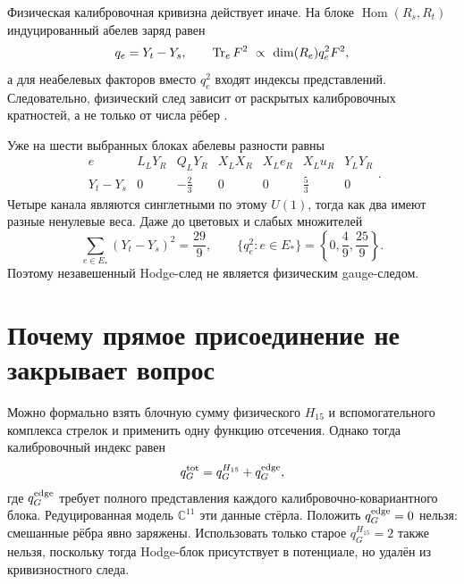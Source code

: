 Физическая калибровочная кривизна действует иначе. На блоке
$\operatorname{Hom}(R_s,R_t)$ индуцированный абелев заряд равен
\begin{equation}
 q_e=Y_t-Y_s,
 \qquad
 \operatorname{Tr}_e F^2\ \mathrel{\propto}\
 \dim(R_e)q_e^2F^2,
 \label{eq:v7-gauge-anchor-induced-charge}
\end{equation}
а для неабелевых факторов вместо $q_e^2$ входят индексы представлений.
Следовательно, физический след зависит от раскрытых калибровочных
кратностей, а не только от числа рёбер \cite{v7-gauge-anchor-beyond-sm}.

Уже на шести выбранных блоках абелевы разности равны
\begin{equation}
 \begin{array}{c|cccccc}
 e&L_LY_R&Q_LY_R&X_LX_R&X_Le_R&X_Lu_R&Y_LY_R\\ \hline
 Y_t-Y_s&0&-\frac23&0&0&\frac53&0
 \end{array}.
 \label{eq:v7-gauge-anchor-selected-charges}
\end{equation}
Четыре канала являются синглетными по этому $U(1)$, тогда как два имеют
разные ненулевые веса. Даже до цветовых и слабых множителей
\begin{equation}
 \sum_{e\in E_*}(Y_t-Y_s)^2=\frac{29}{9},
 \qquad
 \{q_e^2:e\in E_*\}=\left\{0,\frac49,\frac{25}{9}\right\}.
 \label{eq:v7-gauge-anchor-nonuniform-index}
\end{equation}
Поэтому незавешенный Hodge-след не является физическим gauge-следом.

\section{Почему прямое присоединение не закрывает вопрос}

Можно формально взять блочную сумму физического $H_{15}$ и
вспомогательного комплекса стрелок и применить одну функцию отсечения.
Однако тогда калибровочный индекс равен
\begin{equation}
 q_G^{\rm tot}=q_G^{H_{15}}+q_G^{\rm edge},
 \label{eq:v7-gauge-anchor-total-block-index}
\end{equation}
где $q_G^{\rm edge}$ требует полного представления каждого
калибровочно-ковариантного блока. Редуцированная модель $\mathbb C^{11}$
эти данные стёрла. Положить $q_G^{\rm edge}=0$ нельзя: смешанные рёбра
явно заряжены. Использовать только старое $q_G^{H_{15}}=2$ также нельзя,
поскольку тогда Hodge-блок присутствует в потенциале, но удалён из
кривизностного следа.

